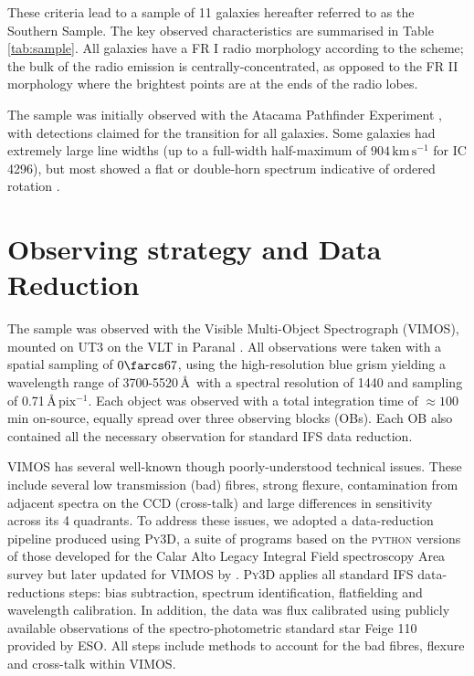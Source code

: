 \documentclass[fleqn,usenatbib,useAMS]{mnras}
\begin{document}
	These criteria lead to a sample of 11 galaxies hereafter referred to as the Southern Sample. The key observed characteristics are summarised in Table \ref{tab:sample}.
	All galaxies have a FR I radio morphology according to the \citet{Fanaroff1974} scheme; the bulk of the radio emission is centrally-concentrated, as opposed to the FR II morphology where the brightest points are at the ends of the radio lobes. 
	
	The sample was initially observed with the Atacama Pathfinder Experiment \citep[APEX; ][]{Gusten2006}, with detections claimed for the  transition for all galaxies. Some galaxies had extremely large line widths (up to a full-width half-maximum of $904 \, \mathrm{km \, s^{-1}}$ for IC 4296), but most showed a flat or double-horn spectrum indicative of ordered rotation \citep{Prandoni2012}.


\section{Observing strategy and Data Reduction}
	\label{sec:obs}
	The sample was observed with the Visible Multi-Object Spectrograph (VIMOS), mounted on UT3 on the VLT in Paranal \citep{LeFevre2003}. All observations were taken with a spatial sampling of $0\farcs67$, using the high-resolution blue grism yielding a wavelength range of 3700-5520\,\AA\ with a spectral resolution of 1440 and sampling of 0.71\,\AA\,$\mathrm{pix^{-1}}$. Each object was observed with a total integration time of $\approx 100$\,min on-source, equally spread over three observing blocks (OBs). Each OB also contained all the necessary observation for standard IFS data reduction. 

	VIMOS has several well-known though poorly-understood technical issues. These include several low transmission (bad) fibres, strong flexure, contamination from adjacent spectra on the CCD (cross-talk) and large differences in sensitivity across its 4 quadrants. To address these issues, we adopted a data-reduction pipeline produced using \textsc{Py3D}, a suite of programs based on the \textsc{python} versions of those developed for the Calar Alto Legacy Integral Field spectroscopy Area survey \citep[CALIFA;][]{Sanchez2012, Husemann2013} but later updated for VIMOS by \citet{Husemann2014}. \textsc{Py3D} applies all standard IFS data-reductions steps: bias subtraction, spectrum identification, flatfielding and wavelength calibration. In addition, the data was flux calibrated using publicly available observations of the spectro-photometric standard star Feige 110 provided by ESO. All steps include methods to account for the bad fibres, flexure and cross-talk within VIMOS. 
\end{document}
